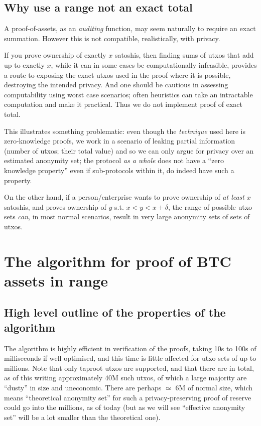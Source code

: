 \documentclass[10pt,a4paper]{article}
\begin{document}
\subsection{Why use a range not an exact total}

A proof-of-assets, as an \emph{auditing} function, may seem naturally to require an exact summation. However this is not compatible, realistically, with privacy.

\vspace{5 pt}

If you prove ownership of exactly $x$ satoshis, then finding sums of utxos that add up to exactly $x$, while it can in some cases be computationally infeasible, provides a route to exposing the exact utxos used in the proof where it is possible, destroying the intended privacy. And one should be cautious in assessing computability using worst case scenarios; often heuristics can take an intractable computation and make it practical. Thus we do not implement proof of exact total.

\vspace{5 pt}
This illustrates something problematic: even though the \emph{technique} used here is zero-knowledge proofs, we work in a scenario of leaking partial information (number of utxos; their total value) and so we can only argue for privacy over an estimated anonymity set; the protocol \emph{as a whole} does not have a ``zero knowledge property'' even if sub-protocols within it, do indeed have such a property.

\vspace{5 pt}

On the other hand, if a person/enterprise wants to prove ownership of \emph{at least} $x$ satoshis, and proves ownership of $y$ s.t. $x < y < x + \delta$, the range of possible utxo sets \emph{can}, in most normal scenarios, result in very large anonymity sets of sets of utxos.

\section{The algorithm for proof of BTC assets in range}

\subsection{High level outline of the properties of the algorithm}

The algorithm is highly efficient in verification of the proofs, taking 10s to 100s of milliseconds if well optimised, and this time is little affected for utxo sets of up to millions. Note that only taproot utxos are supported, and that there are in total, as of this writing approximately 40M such utxos, of which a large majority are ``dusty'' in size and uneconomic. There are perhaps $\simeq$ 6M of normal size, which means ``theoretical anonymity set'' for such a privacy-preserving proof of reserve could go into the millions, as of today (but as we will see ``effective anonymity set'' will be a lot smaller than the theoretical one).
\end{document}
